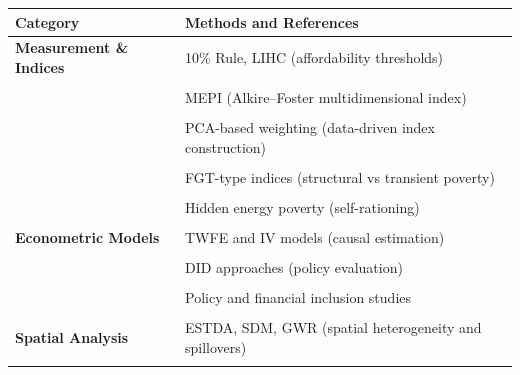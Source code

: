 \documentclass[11pt,a4paper]{article}
\begin{document}
\begin{table}[h!]
\centering
\scriptsize
\begin{tabular}{p{3.3cm} p{8.5cm}}
\toprule
\textbf{Category} & \textbf{Methods and References} \\
\midrule

\textbf{Measurement \& Indices} 
& 10\% Rule, LIHC (affordability thresholds) \\
& \cite{FENG2026107062, CRETI2026109209, ADABOR2026115293, 
dubois2020france, garcia2019spain, van2021dutchpoverty} \\

& MEPI (Alkire--Foster multidimensional index) \\
& \cite{nussbaumer2012mepi, MAHMOOD2026102127, XU2026109217} \\

& PCA-based weighting (data-driven index construction) \\
& \cite{GONG2026115104, yang2026multidimensional, XIE2026109295,
moyo2022subsaharan, silva2020latam, patel2021southasia} \\

& FGT-type indices (structural vs transient poverty) \\
& \cite{CHEN2026109339, rahman2023disasters} \\

& Hidden energy poverty (self-rationing) \\
& \cite{WHITE2026104583, smith2022hidden} \\

\midrule

\textbf{Econometric Models} 
& TWFE and IV models (causal estimation) \\
& \cite{ULLAH2026115185, zhou2026graying, ADABOR2026115293} \\

& DID approaches (policy evaluation) \\
& \cite{XU2026109217, liu2021straw, wang2021rural, zhao2022unintended} \\

& Policy and financial inclusion studies \\
& \cite{jansen2022subsidies, perez2023retro, ADJEIMANTEY2026140083,
okocha2023mobilemoney, zhang2022fintech} \\

\midrule

\textbf{Spatial Analysis} 
& ESTDA, SDM, GWR (spatial heterogeneity and spillovers) \\
& \cite{XIE2026109295, yang2026multidimensional} \\


\end{tabular}
\end{table}
\end{document}
